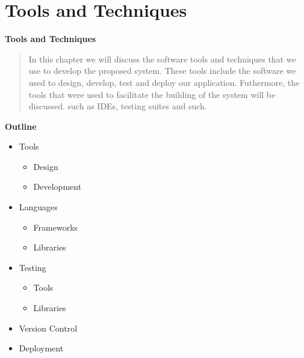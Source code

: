
\section{Tools and Techniques}

\vspace{20mm}

\Huge{\textbf{Tools and Techniques}}

\vspace{20mm}




\begin{abstract}
    In this chapter we will discuss the software tools and techniques that we use to develop the proposed system. These tools include the software we used to design, develop, test and deploy our application. Futhermore, the tools that were used to facilitate the building of the system will be discussed. such as IDEs, testing suites and such.

\end{abstract}

\vspace{20mm}

\large{\textbf{Outline}}

\begin{center}
    \begin{itemize}
        \item Tools
              \begin{itemize}
                  \item Design
                  \item Development
              \end{itemize}
        \item Languages
              \begin{itemize}
                  \item Frameworks
                  \item Libraries
              \end{itemize}
        \item Testing
              \begin{itemize}
                  \item Tools
                  \item Libraries
              \end{itemize}

        \item Version Control
        \item Deployment

    \end{itemize}
\end{center}
\pagebreak







